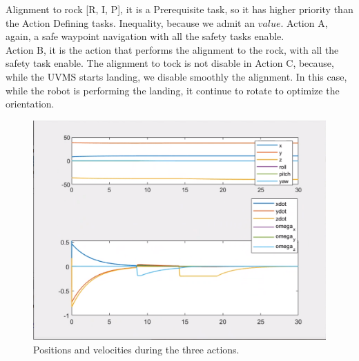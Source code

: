 \documentclass{article}
\begin{document}
Alignment to rock [R, I, P], it is a Prerequisite task, so it has higher priority than the Action Defining tasks. Inequality, because we admit an $value$. 
Action A, again, a safe waypoint navigation with all the safety tasks enable. \\
Action B, it is the action that performs the alignment to the rock, with all the safety task enable. The alignment to tock is not disable in Action C, because, while the UVMS starts landing, we disable smoothly the alignment. In this case, while the robot is performing the landing, it continue to rotate to optimize the orientation.
\begin{figure}[h]
    \centering
    \includegraphics[scale=0.4]{311_ppdot.png}
    \caption{Positions and velocities during the three actions.}
    \label{graphes3}
\end{figure}
\end{document}
